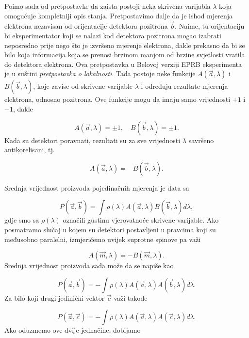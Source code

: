 Po\dj imo sada od pretpostavke da zaista postoji neka skrivena varijabla $\lambda$ koja omogućuje kompletniji opis stanja.
Pretpostavimo dalje da je ishod mjerenja elektrona nezavisan od orijentacije detektora pozitrona  $\vec{b}$. Naime, tu orijentaciju bi eksperimentator koji se nalazi kod detektora pozitrona mogao izabrati neposredno prije nego što je izvršeno mjerenje elektrona, dakle prekasno da bi se bilo koja informacija koja se prenosi brzinom manjom od brzine svjetlosti vratila do detektora elektrona. Ova pretpostavka u Belovoj verziji EPRB eksperimenta je u suštini {\it{pretpostavka o lokalnosti}}.
Tada postoje neke funkcije $A(\vec{a}, \lambda)$ i $B(\vec{b}, \lambda)$, koje zavise od skrivene varijable $\lambda$ i određuju rezultate mjerenja elektrona, odnosno pozitrona.
Ove funkcije mogu da imaju samo vrijednosti $+1$ i $-1$, dakle 

\begin{equation}
    A(\vec{a}, \lambda) = \pm 1, \quad B(\vec{b}, \lambda) = \pm 1.
\end{equation}
Kada su detektori poravnati, rezultati su za sve vrijednosti $\lambda$ savršeno antikorelisani, tj.

\begin{equation}
    A(\vec{a}, \lambda) = -B(\vec{b}, \lambda).
\end{equation}

Srednja vrijednost proizvoda pojedinačnih mjerenja je data sa

\begin{equation}
    P(\vec{a}, \vec{b}) = \int \rho (\lambda) A(\vec{a}, \lambda) B(\vec{b}, \lambda) d\lambda,
\end{equation}
gdje smo sa $\rho (\lambda)$ označili gustinu vjerovatnoće skrivene varijable.
Ako posmatramo slučaj u kojem su detektori postavljeni u pravcima koji su međusobno paralelni, iz\-mjeri\'cemo uvijek suprotne spinove pa važi

\begin{equation}
    A(\vec{m}, \lambda) = - B(\vec{m}, \lambda).
\end{equation}
Srednja vrijednost proizvoda sada može da se napiše kao

\begin{equation}
    P(\vec{a}, \vec{b}) = - \int \rho (\lambda) A(\vec{a}, \lambda) A(\vec{b}, \lambda) d\lambda.
\end{equation}
Za bilo koji drugi jedinični vektor $\vec{c}$ važi takođe

\begin{equation}
    P(\vec{a}, \vec{c}) = - \int \rho (\lambda) A(\vec{a}, \lambda) A(\vec{c}, \lambda) d\lambda.
\end{equation}
Ako oduzmemo ove dvije jednačine, dobijamo

